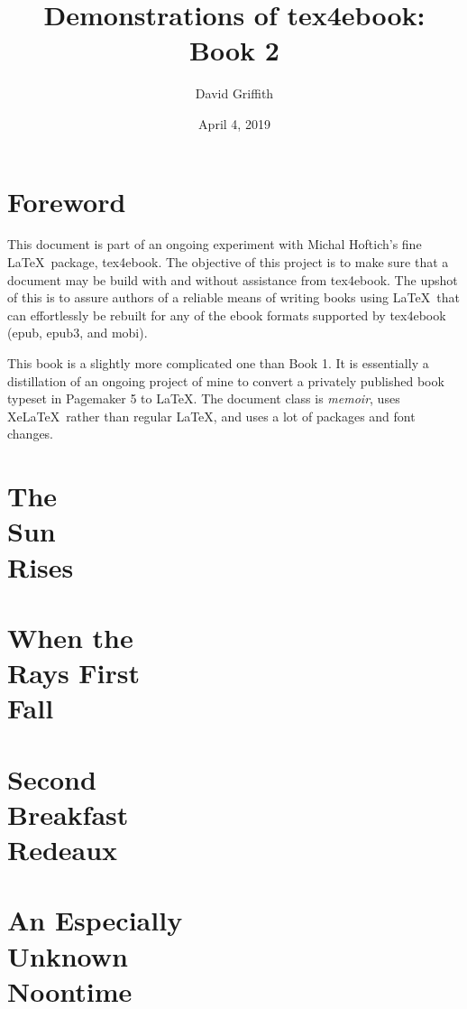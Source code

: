 \documentclass[12pt]{memoir}
\title{\Huge\textbf{Demonstrations of tex4ebook: Book 2}}
\author{David Griffith}
\date{April 4, 2019}
\begin{document}
\frontmatter
\maketitle
\cleartorecto
\tableofcontents*

\mainmatter
\parskip=12pt

\chapter*{\bordeauxfont Foreword}
This document is part of an ongoing experiment with Michal Hoftich's 
fine \LaTeX\ package, tex4ebook.  The objective of this project is to 
make sure that a document may be build with and without assistance from 
tex4ebook.  The upshot of this is to assure authors of a reliable means 
of writing books using \LaTeX\ that can effortlessly be rebuilt for any 
of the ebook formats supported by tex4ebook (epub, epub3, and mobi).

This book is a slightly more complicated one than Book 1.  It is
essentially a distillation of an ongoing project of mine to convert a
privately published book typeset in Pagemaker 5 to \LaTeX.  The document
class is \textit{memoir}, uses Xe\LaTeX\ rather than regular \LaTeX, and
uses a lot of packages and font changes.


\chapter[The Sun Rises]
{The\\
Sun\\
Rises}
\lipsum[1-20]

\chapter[When the Rays First Fall]
{When the\\
Rays First\\
Fall}
\lipsum[21-40]

\chapter[Second Breakfast Redeaux]
{Second\\
Breakfast\\
Redeaux}
\lipsum[41-60]

\chapter[An Especially Unknown Noontime]
{An Especially\\
Unknown\\
Noontime}
\lipsum[61-80]
\end{document}
